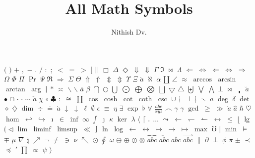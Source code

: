 \documentclass{proc}
\title{All Math Symbols}
\author{Nithish Dv.}
\begin{document}
\maketitle
  $($
  $)$
  $+$
  $,$
  $-$
  $.$
  $/$
  $:$
  $;$
  $<$
  $=$
  $>$
  $[$
  $\Arrowvert$
  $\Box$
  $\Delta$
  $\Diamond$
  $\Downarrow$
  $\Downarrow$
  $\Gamma$
  $\Im$
  $\Join$
  $\Lambda$
  $\Leftarrow$
  $\Leftrightarrow$
  $\Longleftarrow$
  $\Longleftrightarrow$
  $\Longrightarrow$
  $\Omega$
  $\Phi$
  $\Pi$
  $\Pr$
  $\Psi$
  $\Re$
  $\Rightarrow$
  $\Sigma$
  $\Theta$
  $\Uparrow$
  $\Uparrow$
  $\Updownarrow$
  $\Updownarrow$
  $\Upsilon$
  $\Xi$
  $\acute{a}$
  $\aleph$
  $\alpha$
  $\amalg$
  $\angle$
  $\approx$
  $\arccos$
  $\arcsin$
  $\arctan$
  $\arg$
  $\arrowvert$
  $\ast$
  $\asymp$
  $\backslash$
  $\backslash$
  $\bar{a}$
  $\beta$
  $\bigcap$
  $\bigcirc$
  $\bigcup$
  $\bigodot$
  $\bigoplus$
  $\bigotimes$
  $\bigsqcup$
  $\bigtriangledown$
  $\bigtriangleup$
  $\biguplus$
  $\bigvee$
  $\bigwedge$
  $\bot$
  $\bowtie$
  $\bracevert$
  $\breve{a}$
  $\bullet$
  $\cap$
  $\cdot$
  $\cdotp$
  $\cdots$
  $\check{a}$
  $\chi$
  $\circ$
  $\clubsuit$
  $\colon$
  $\cong$
  $\coprod$
  $\cos$
  $\cosh$
  $\cot$
  $\coth$
  $\csc$
  $\cup$
  $\dagger$
  $\dashv$
  $\ddagger$
  $\ddots$
  $\ddot{a}$
  $\deg$
  $\delta$
  $\det$
  $\diamond$
  $\diamondsuit$
  $\dim$
  $\div$
  $\doteq$
  $\dot{a}$
  $\downarrow$
  $\downarrow$
  $\ell$
  $\emptyset$
  $\epsilon$
  $\equiv$
  $\eta$
  $\exists$
  $\exp$
  $\flat$
  $\forall$
  $\frac{abc}{xyz}$
  $\frown$
  $\gamma$
  $\gamma$
  $\gcd$
  $\geq$
  $\gg$
  $\grave{a}$
  $\hat{a}$
  $\hbar$
  $\heartsuit$
  $\hom$
  $\hookleftarrow$
  $\hookrightarrow$
  $\imath$
  $\in$
  $\inf$
  $\infty$
  $\int$
  $\jmath$
  $\kappa$
  $\ker$
  $\lambda$
  $\langle$
  $\lceil$
  $\ldotp$
  $\ldots$
  $\leadsto$
  $\leftarrow$
  $\leftharpoondown$
  $\leftharpoonup$
  $\leftrightarrow$
  $\leq$
  $\lfloor$
  $\lg$
  $\lgroup$
  $\lhd$
  $\lim$
  $\liminf$
  $\limsup$
  $\ll$
  $\lmoustache$
  $\ln$
  $\log$
  $\longleftarrow$
  $\longleftrightarrow$
  $\longmapsto$
  $\longrightarrow$
  $\mapsto$
  $\max$
  $\mho$
  $\mid$
  $\min$
  $\models$
  $\mp$
  $\mu$
  $\nabla$
  $\natural$
  $\nearrow$
  $\neg$
  $\neq$
  $\ni$
  $\nu$
  $\nwarrow$
  $\odot$
  $\oint$
  $\omega$
  $\ominus$
  $\oplus$
  $\oslash$
  $\otimes$
  $\overbrace{abc}$
  $\overleftarrow{abc}$
  $\overline{abc}$
  $\overrightarrow{abc}$
  $\parallel$
  $\partial$
  $\perp$
  $\phi$
  $\pi$
  $\pm$
  $\prec$
  $\preceq$
  $\prime$
  $\prod$
  $\propto$
  $\psi$
  $\rangle$
\end{document}
